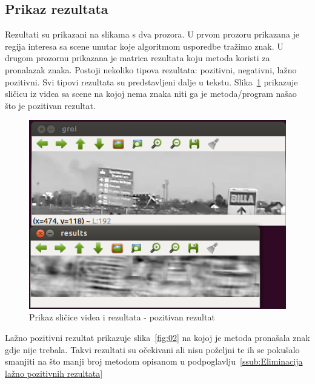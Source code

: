 \newpage
\subsection{Prikaz rezultata} %
\label{sub:Prikaz rezultata}

Rezultati su prikazani na slikama s dva prozora. U prvom prozoru 
prikazana je regija interesa sa scene unutar koje algoritmom
usporedbe tražimo znak. U drugom prozornu prikazana je matrica rezultata
koju metoda koristi za pronalazak znaka. Postoji nekoliko tipova
rezultata: pozitivni, negativni, lažno pozitivni.
Svi tipovi rezultata su predstavljeni dalje u tekstu.
Slika~\ref{fig:01} prikazuje sličicu iz videa sa scene na kojoj nema
znaka niti ga je metoda/program našao što je pozitivan rezultat.

\begin{figure}[h]
\centering
\includegraphics[scale=0.5]{figures/01.png}
\caption{Prikaz sličice videa i rezultata - pozitivan rezultat}
\label{fig:01}
\end{figure}

Lažno pozitivni rezultat prikazuje slika~\ref{fig:02} na kojoj je metoda
pronašala znak gdje nije trebala. Takvi rezultati su očekivani ali nisu
poželjni te ih se pokušalo smanjiti na što manji broj metodom opisanom 
u podpoglavlju~\ref{ssub:Eliminacija lažno pozitivnih rezultata}

